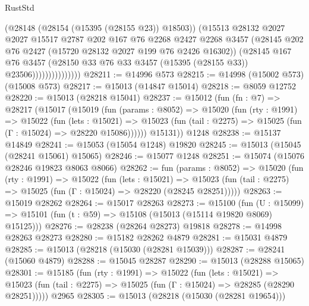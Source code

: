 \begin{lexlean}{RustStd}
\begin{coremodule}
                            (@28148 (@28154 (@15395 (@28155 @23)) @18503))
                            (@15513
                              @28132
                              @2027
                              @2027
                              @15517
                              @2787
                              @202
                              @167
                              @76
                              @2268
                              @2427
                              @2268
                              @3457
                              (@28145 @202 @76 @2427 (@15720 @28132 @2027 @199 @76 @2426 @16302))
                              (@28145
                                @167
                                @76
                                @3457
                                (@28150
                                  @33
                                  @76
                                  @33
                                  @3457
                                  (@15395 (@28155 @33))
                                  @23506)))))))))))))))
@28211 := @14996 @573
@28215 := @14998 (@15002 @573) (@15008 @573)
@28217 := @15013 (@14847 @15014)
@28218 := @8059 @12752
@28220 := @15013 (@28218 @15041)
@28237 := @15012
    (fun (fn : @7) =>
    @28217
      (@15017
        (@15019
          (fun (params : @8052) =>
          @15020
            (fun (rty : @1991) =>
            @15022
              (fun (lets : @15021) =>
              @15023 (fun (tail : @2275) => @15025 (fun (Γ : @15024) => @28220 @15086))))))
        @15131))
    @1248
@28238 := @15137 @14849
@28241 := @15053 (@15054 @1248) @19820
@28245 := @15013 (@15045 (@28241 @15061) @15065)
@28246 := @15077 @1248
@28251 := @15074 (@15076 @28246 @19823 @8063 @8066)
@28262 := fun (params : @8052) =>
  @15020
    (fun (rty : @1991) =>
    @15022
      (fun (lets : @15021) =>
      @15023 (fun (tail : @2275) => @15025 (fun (Γ : @15024) => @28220 (@28245 @28251)))))
@28263 := @15019 @28262
@28264 := @15017 @28263
@28273 := @15100
    (fun (U : @15099) => @15101 (fun (t : @59) => @15108 (@15013 (@15114 @19820 @8069) @15125)))
@28276 := @28238 (@28264 @28273) @19818
@28278 := @14998 @28263 @28273
@28280 := @15182 @28262 @4879
@28281 := @15031 @4879
@28285 := @15013 (@28218 (@15030 (@28281 @15039)))
@28287 := @28241 (@15060 @4879)
@28288 := @15045 @28287
@28290 := @15013 (@28288 @15065)
@28301 := @15185
    (fun (rty : @1991) =>
    @15022
      (fun (lets : @15021) =>
      @15023 (fun (tail : @2275) => @15025 (fun (Γ : @15024) => @28285 (@28290 @28251)))))
    @2965
@28305 := @15013 (@28218 (@15030 (@28281 @19654)))

\end{coremodule}
\end{lexlean}
